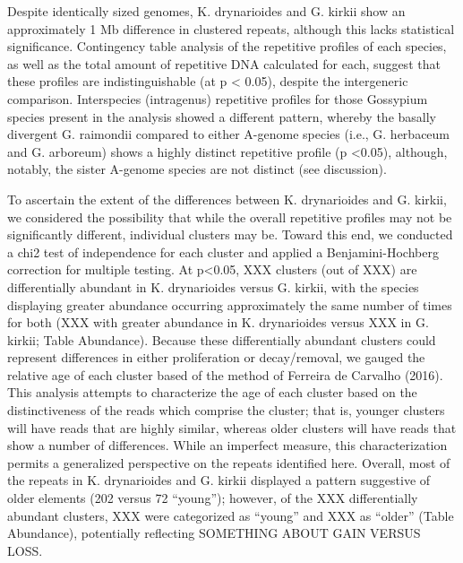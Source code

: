 \documentclass[10pt,letterpaper]{article}
\newcommand{\note}[2][]{\added[id=#1,remark={#2}]{}}
\begin{document}
Despite identically sized genomes, K. drynarioides and G. kirkii show an
approximately 1 Mb\note[Corrinne]{put the linear regression stuff in here?}
difference in clustered repeats, although this lacks statistical significance.
Contingency table analysis of the repetitive profiles of each species, as well
as the total amount of repetitive DNA calculated for each, suggest that these
profiles are indistinguishable (at p < 0.05), despite the intergeneric
comparison. Interspecies (intragenus) repetitive profiles for those Gossypium
species present in the analysis showed a different pattern, whereby the basally
divergent G. raimondii compared to either A-genome species (i.e., G. herbaceum
and G. arboreum) shows a highly distinct repetitive profile (p <0.05), although,
notably, the sister A-genome species are not distinct (see discussion).

To ascertain the extent of the differences between K. drynarioides and G.
kirkii, we considered the possibility that while the overall repetitive profiles
may not be significantly different, individual clusters may be. Toward this end,
we conducted a chi2 test of independence for each cluster and applied a
Benjamini-Hochberg correction for multiple testing. At p<0.05, XXX clusters (out
of XXX) are differentially abundant in K. drynarioides versus G. kirkii, with
the species displaying greater abundance occurring approximately the same number
of times for both (XXX with greater abundance in K. drynarioides versus XXX in
G. kirkii; Table Abundance). Because these differentially abundant clusters
could represent differences in either proliferation or decay/removal, we gauged
the relative age of each cluster based of the method of Ferreira de Carvalho
(2016). This analysis attempts to characterize the age of each
cluster\note[Corrinne]{should we redo this just for the Kok/Kirk reads? would
  the A-genome reads, minimally, be biasing some of these toward "youth"?} based
on the distinctiveness of the reads which comprise the cluster; that is, younger
clusters will have reads that are highly similar, whereas older clusters will
have reads that show a number of differences. While an imperfect measure, this
characterization permits a generalized perspective on the repeats identified
here. Overall, most of the repeats in K. drynarioides and G. kirkii displayed a
pattern suggestive of older elements (202 versus 72 “young”); however, of the
XXX differentially abundant clusters, XXX were categorized as “young” and XXX as
“older” (Table Abundance), potentially reflecting SOMETHING ABOUT GAIN VERSUS
LOSS.
\end{document}
